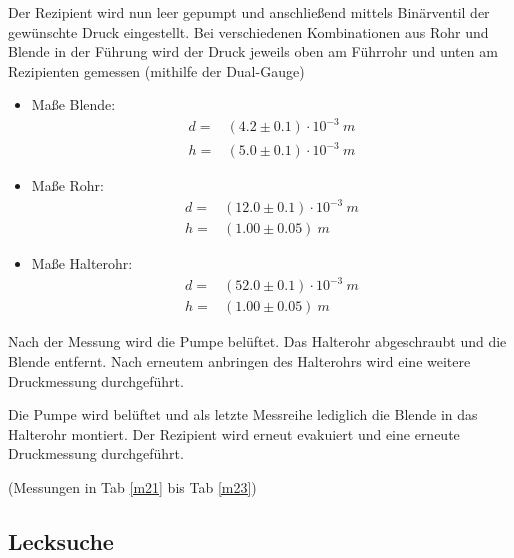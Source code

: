 \documentclass[12pt, a4paper]{scrartcl}
\begin{document}
    	Der Rezipient wird nun leer gepumpt und anschließend mittels Binärventil der gewünschte Druck eingestellt. Bei verschiedenen Kombinationen aus Rohr und Blende in der Führung wird der Druck jeweils oben am Führrohr und unten am Rezipienten gemessen (mithilfe der Dual-Gauge)
    	
    	\begin{itemize}
    		\item Maße Blende:
    			\begin{align*}
    				d=&(4.2\pm 0.1)\cdot 10^{-3}\ m\\
    				h=&(5.0\pm 0.1)\cdot 10^{-3}\ m
    			\end{align*}
    			
    		\item Maße Rohr:
    			\begin{align*}
    				d=&(12.0\pm 0.1)\cdot 10^{-3}\ m\\
    				h=&(1.00\pm 0.05)\ m
    			\end{align*}
    			
    		\item Maße Halterohr:
    			\begin{align*}
    				d=&(52.0\pm 0.1)\cdot 10^{-3}\ m\\
    				h=&(1.00\pm 0.05)\ m
    			\end{align*}
    	\end{itemize}
    
    	
   	
   		Nach der Messung wird die Pumpe belüftet. Das Halterohr abgeschraubt und die Blende entfernt. Nach erneutem anbringen des Halterohrs wird eine weitere Druckmessung durchgeführt.
   	
   		Die Pumpe wird belüftet und als letzte Messreihe lediglich die Blende in das Halterohr montiert. Der Rezipient wird erneut evakuiert und eine erneute Druckmessung durchgeführt.
   		
   		(Messungen in Tab \ref{m21} bis Tab \ref{m23})
   	    
    \subsection{Lecksuche}
    
\end{document}

